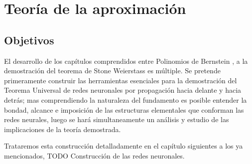 
\chapter{Teoría de la aproximación}
\section{Objetivos}  

El desarrollo de los capítulos comprendidos entre Polinomios de Bernstein , 
a la demostración del teorema de Stone Weierstass  es múltiple.
Se pretende primeramente construir las herramientas esenciales para la demostración del 
Teorema Universal de redes neuronales por propagación hacia delante y hacia detrás; 
mas comprendiendo la naturaleza del fundamento es posible entender la bondad, alcance e imposición
de las estructuras elementales que conforman las redes neurales, luego se hará simultaneamente
un análisis y estudio de las implicaciones de la teoría demostrada. 

Trataremos esta construcción detalladamente en el capítulo siguientes a los ya mencionados, 
TODO Construcción de las redes neuronales. 




